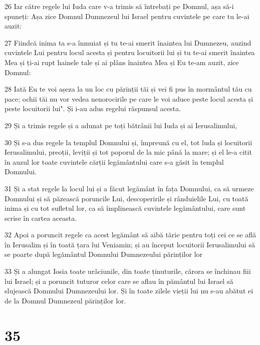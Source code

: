 \par 26 Iar către regele lui Iuda care v-a trimis să întrebați pe Domnul, așa să-i spuneți: Așa zice Domnul Dumnezeul lui Israel pentru cuvintele pe care tu le-ai auzit:
\par 27 Fiindcă inima ta s-a înmuiat și tu te-ai smerit înaintea lui Dumnezeu, auzind cuvintele Lui pentru locul acesta și pentru locuitorii lui și tu te-ai smerit înaintea Mea și ți-ai rupt hainele tale și ai plâns înaintea Mea și Eu te-am auzit, zice Domnul:
\par 28 Iată Eu te voi așeza la un loc cu părinții tăi și vei fi pus în mormântul tău cu pace; ochii tăi nu vor vedea nenorocirile pe care le voi aduce peste locul acesta și peste locuitorii lui". Și i-au adus regelui răspunsul acesta.
\par 29 Și a trimis regele și a adunat pe toți bătrânii lui Iuda și ai Ierusalimului,
\par 30 Și s-a dus regele la templul Domnului și, împreună cu el, tot luda și locuitorii Ierusalimului, preoții, leviții și tot poporul de la mic până la mare; și el le-a citit în auzul lor toate cuvintele cărții legământului care s-a găsit în templul Domnului.
\par 31 Și a stat regele la locul lui și a făcut legământ în fața Domnului, ca să urmeze Domnului și să păzească poruncile Lui, descoperirile și rânduielile Lui, cu toată inima și cu tot sufletul lor, ca să împlinească cuvintele legământului, care sunt scrise în cartea aceasta.
\par 32 Apoi a poruncit regele ca acest legământ să aibă tărie pentru toți cei ce se află în Ierusalim și în toată țara lui Veniamin; și au început locuitorii Ierusalimului să se poarte după legământul Domnului Dumnezeului părinților lor
\par 33 Și a alungat Iosia toate urâciunile, din toate ținuturile, cărora se închinau fiii lui Israel; și a poruncit tuturor celor care se aflau în pământul lui Israel să slujească Domnului Dumnezeului lor. Și în toate zilele vieții lui nu s-au abătut ei de la Domnul Dumnezeul părinților lor.

\chapter{35}

